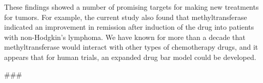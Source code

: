 \documentclass{article}
\begin{document}
These findings showed a number of promising targets for making new treatments for tumors. For example, the current study also found that methyltransferase indicated an improvement in remission after induction of the drug into patients with non-Hodgkin’s lymphoma. We have known for more than a decade that methyltransferase would interact with other types of chemotherapy drugs, and it appears that for human trials, an expanded drug bar model could be developed.

\#\#\#
\end{document}
